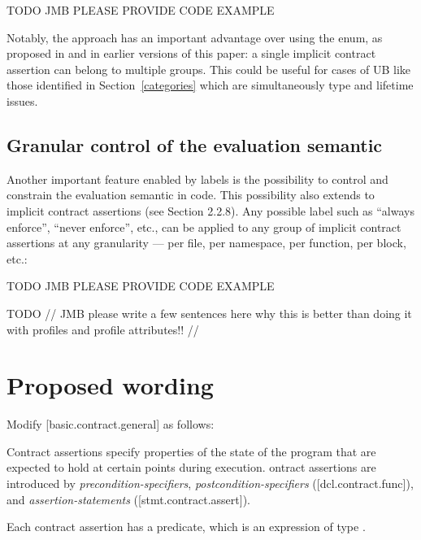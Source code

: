 \begin{codeblock}
TODO JMB PLEASE PROVIDE CODE EXAMPLE
\end{codeblock}

Notably, the \cite{P3400R1} approach has an important advantage over using the  enum, as proposed in \cite{P3081R1} and in earlier versions of this paper: a single implicit contract assertion can belong to multiple groups. This could be useful for cases of UB like those identified in Section~\ref{categories} which are simultaneously type and lifetime issues.

\subsection{Granular control of the evaluation semantic}
\label{semantic}

Another important feature enabled by labels is the possibility to control and constrain the evaluation semantic in code. This possibility also extends to implicit contract assertions (see \cite{P3400R1} Section 2.2.8). Any possible label such as ``always enforce'', ``never enforce'', etc., can be applied to any group of implicit contract assertions at any granularity --- per file, per namespace, per function, per block, etc.:

\begin{codeblock}
TODO JMB PLEASE PROVIDE CODE EXAMPLE
\end{codeblock}

TODO // JMB please write a few sentences here why this is better than doing it with profiles and profile attributes!! //

\section{Proposed wording}
\label{wording}

Modify [basic.contract.general] as follows:

\begin{adjustwidth}{0.5cm}{0.5cm}
Contract assertions specify properties of the state of the program
that are expected to hold at certain points during execution. ontract assertions
are introduced by \emph{precondition-specifiers}, \emph{postcondition-specifiers} ([dcl.contract.func]),
and \emph{assertion-statements} ([stmt.contract.assert]). 

Each contract assertion has a predicate, which is an expression of type . 
\begin{note}
\end{note}
\end{adjustwidth}

